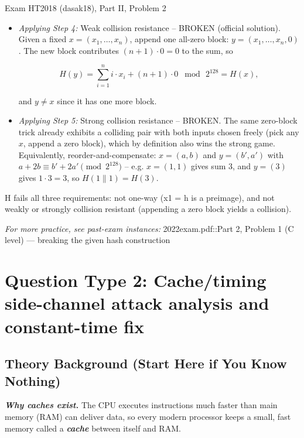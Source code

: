 \documentclass[12pt, a4paper]{article}
\newcommand{\term}[1]{\textbf{\textit{#1}}}        %
\begin{document}
\begin{practicebox}{Exam HT2018 (dasak18), Part II, Problem 2}
\begin{itemize}
\[
H(x) = 1 \cdot x_1 \bmod 2^{128} = h,
\]

a preimage produced with zero effort. The coefficient $1$ of the first block is what makes this trivial: block 1 passes straight through to the digest.
    \item \textit{Applying Step 4:} Weak collision resistance -- BROKEN (official solution). Given a fixed $x = (x_1, \dots, x_n)$, append one all-zero block: $y = (x_1, \dots, x_n, 0)$. The new block contributes $(n+1) \cdot 0 = 0$ to the sum, so

\[
H(y) = \sum_{i=1}^{n} i \cdot x_i + (n+1) \cdot 0 \;\bmod\, 2^{128} = H(x),
\]

and $y \neq x$ since it has one more block.
    \item \textit{Applying Step 5:} Strong collision resistance -- BROKEN. The same zero-block trick already exhibits a colliding pair with both inputs chosen freely (pick any $x$, append a zero block), which by definition also wins the strong game.
    Equivalently, reorder-and-compensate: $x = (a, b)$ and $y = (b', a')$ with $a + 2b \equiv b' + 2a' \pmod{2^{128}}$ -- e.g. $x = (1, 1)$ gives sum $3$, and $y = (3)$ gives $1 \cdot 3 = 3$, so $H(1 \| 1) = H(3)$.
\end{itemize}

\begin{answerbox}
H fails all three requirements: not one-way (x1 = h is a preimage), and not weakly or strongly collision resistant (appending a zero block yields a collision).
\end{answerbox}
\end{practicebox}

\textit{For more practice, see past-exam instances:} 2022exam.pdf::Part 2, Problem 1 (C level) — breaking the given hash construction

\section{Question Type 2: Cache/timing side-channel attack analysis and constant-time fix}

\subsection*{Theory Background (Start Here if You Know Nothing)}

\term{Why caches exist.} The CPU executes instructions much faster than main memory (RAM) can deliver data, so every modern processor keeps a small, fast memory called a \term{cache} between itself and RAM.
\end{document}
